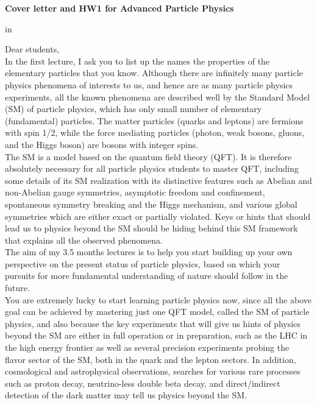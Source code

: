 
\textheight=9.5in \voffset=-1.0in \textwidth=6.5in \hoffset=-0.5in
\parskip=0pt


\begin{center}
{\large\bf Cover letter and HW1 for Advanced Particle Physics} \\

\end{center}

 in

Dear students, \\

  In the first lecture, I ask you to list up the names the
  properties of the elementary particles that you know.
  Although there are infinitely many particle physics phenomena
  of interests to us, and hence are as many particle physics
  experiments, all the known phenomena are described well by
  the Standard Model (SM) of particle physics, which has only
  small number of elementary (fundamental) particles.
  The matter particles (quarks and leptons) are fermions with
  spin 1/2, while the force mediating particles (photon,
  weak bosons, gluons, and the Higgs boson) are bosons with
  integer spins.\\

  The SM is a model based on the quantum field theory (QFT).
  It is therefore absolutely necessary for all particle
  physics students to master QFT, including some details
  of its SM realization with its distinctive features such
  as Abelian and non-Abelian gauge symmetries, asymptotic
  freedom and confinement, spontaneous symmetry breaking
  and the Higgs mechanism, and various global symmetries
  which are either exact or partially violated.  Keys or
  hints that should lead us to physics beyond the SM
  should be hiding behind this SM framework that explains
  all the observed phenomena.\\

  The aim of my 3.5 months lectures is to help you start
  building up your own perspective on the present status
  of particle physics, based on which your pursuits for
  more fundamental understanding of nature should follow
  in the future.\\

  You are extremely lucky to start learning particle
  physics now, since all the above goal can be achieved
  by mastering just one QFT model, called the SM of
  particle physics, and also because the key experiments
  that will give us hints of physics beyond the SM
  are either in full operation or in preparation, such
  as the LHC in the high energy frontier as well as several
  precision experiments probing the flavor sector of the SM,
  both in the quark and the lepton sectors. In addition,
  cosmological and astrophysical observations, searches for
  various rare processes such as proton decay, neutrino-less
  double beta decay, and direct/indirect detection of the
  dark matter may tell us physics beyond the SM.\\

